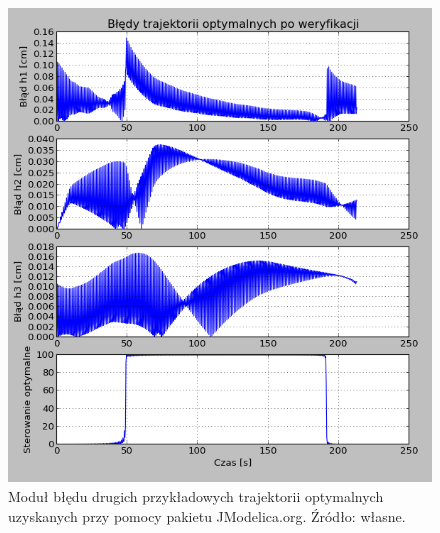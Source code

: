 \begin{figure}[htp]
    \centering
    \includegraphics{Grafika/plot_30_30_30-20_25_20_raw-error_200}
    \caption{Moduł błędu drugich przykładowych trajektorii optymalnych uzyskanych przy pomocy pakietu JModelica.org. Źródło: własne.}
    \label{fig:plot303030-202520raw-error200}
\end{figure}



